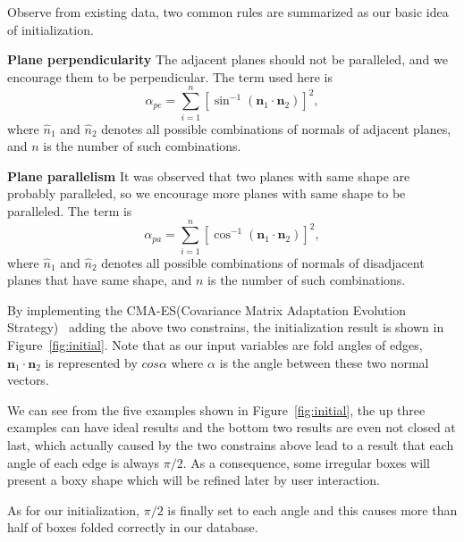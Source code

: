 \documentclass[submission]{gmp2018}
\begin{document}
Observe from existing data, two common rules are summarized as our basic idea of initialization.

\noindent
\textbf{Plane perpendicularity} The adjacent planes should not be paralleled, and we encourage them to be perpendicular. The term used here is
\begin{equation}
\alpha_{pe} = \sum_{i = 1}^{n} [\sin^{-1}(\mathbf{n}_1 \cdot \mathbf{n}_2)]^{2},
\label{equ:perp}
\end{equation}
where $\hat{n}_1$ and $\hat{n}_2$ denotes all possible combinations of normals of adjacent planes, and $n$ is the number of such combinations.

\noindent
\textbf{Plane parallelism} It was observed that two planes with same shape are probably paralleled, so we encourage more planes with same shape to be paralleled. The term is
\begin{equation}
\alpha_{pa} = \sum_{i = 1}^{n} [\cos^{-1}(\mathbf{n}_1 \cdot \mathbf{n}_2)]^{2},
\label{equ:para}
\end{equation}
where $\hat{n}_1$ and $\hat{n}_2$ denotes all possible combinations of normals of disadjacent planes that have same shape,  and $n$ is the number of such combinations.

By implementing the CMA-ES(Covariance Matrix Adaptation Evolution Strategy)~\cite{CMAES} adding the above two constrains, the initialization result is shown in Figure~\ref{fig:initial}. Note that as our input variables are fold angles of edges, $\mathbf{n}_1 \cdot \mathbf{n}_2$ is represented by $cos\alpha$ where $\alpha$ is the angle between these two normal vectors. 

We can see from the five examples shown in Figure~\ref{fig:initial}, the up three examples can have ideal results and the bottom two results are even not closed at last, which actually caused by the two constrains above lead to a result that each angle of each edge is always $\pi/2$. As a consequence, some irregular boxes will present a boxy shape which will be refined later by user interaction.

As for our initialization, $\pi/2$ is finally set to each angle and this causes more than half of boxes folded correctly in our database.
\end{document}
